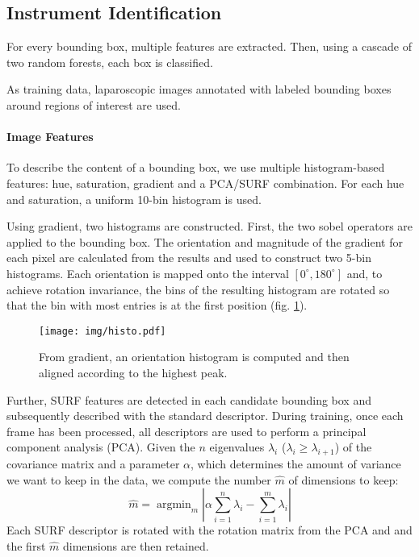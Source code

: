 \documentclass{llncs}
\DeclareMathOperator*{\argmin}{argmin}
\begin{document}
\subsection{Instrument Identification}
For every bounding box, multiple features are extracted.
Then, using a cascade of two random forests, each box is classified.

As training data, laparoscopic images annotated with labeled bounding boxes around regions of interest are used. %
\paragraph{Image Features}
To describe the content of a bounding box, we use multiple histogram-based features: hue, saturation, gradient and a PCA/SURF\cite{PCASURF} combination.
For each hue and saturation, a uniform 10-bin histogram is used.

Using gradient, two histograms are constructed.
First, the two sobel operators are applied to the bounding box.
The orientation and magnitude of the gradient for each pixel are calculated from the results and used to construct two 5-bin histograms.
Each orientation is mapped onto the interval $[0^{\circ},180^{\circ}]$ and, to achieve rotation invariance, the bins of the resulting histogram are rotated so that the bin with most entries is at the first position (fig. \ref{fig:histo}).
\begin{figure}[tb]
\centering
   \texttt{[image: img/histo.pdf]}
   \caption{From gradient, an orientation histogram is computed and then aligned according to the highest peak.}
   
   \label{fig:histo}       %
\end{figure}
Further, SURF features \cite{bay2008speeded} are detected in each candidate bounding box and subsequently described with the standard descriptor.
During training, once each frame has been processed, all descriptors are used to perform a principal component analysis (PCA).
Given the $n$ eigenvalues $\lambda_i$ ($\lambda_i \geq \lambda_{i+1}$) of the covariance matrix and a parameter $\alpha$, which determines the amount of variance we want to keep in the data, we compute the number $\hat{m}$ of dimensions to keep:
$$
 \hat{m} = \argmin_m | \alpha\sum_{i=1}^{n} \lambda_i - \sum_{i=1}^{m} \lambda_i|
$$
Each SURF descriptor is rotated with the rotation matrix from the PCA and and the first $\hat{m}$ dimensions are then retained.
\end{document}
